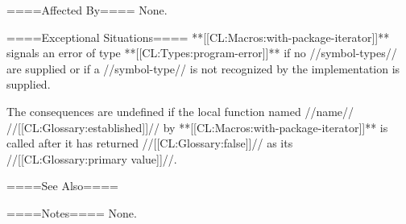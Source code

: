 ====Affected By====
None.

====Exceptional Situations====
**[[CL:Macros:with-package-iterator]]** signals an error of type **[[CL:Types:program-error]]** if no //symbol-types// are supplied or if a //symbol-type// is not recognized by the implementation is supplied.

The consequences are undefined if the local function named //name// //[[CL:Glossary:established]]// by **[[CL:Macros:with-package-iterator]]** is called after it has returned //[[CL:Glossary:false]]// as its //[[CL:Glossary:primary value]]//.

====See Also====
{\secref\TraversalRules}

====Notes====
None.

  
